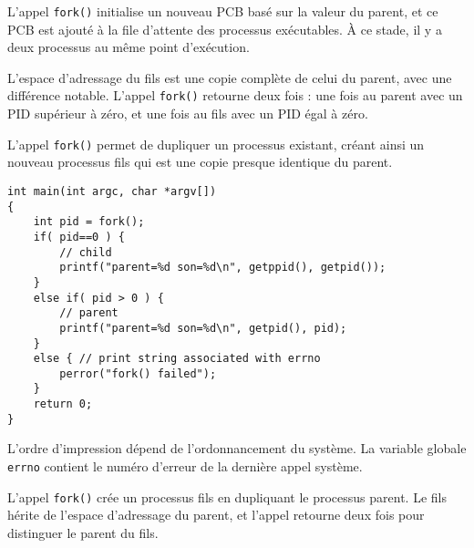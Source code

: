 \documentclass[12pt]{article}
\begin{document}
L'appel \texttt{fork()} initialise un nouveau PCB basé sur la valeur du parent, et ce PCB est ajouté à la file d'attente des processus exécutables. À ce stade, il y a deux processus au même point d'exécution.

L'espace d'adressage du fils est une copie complète de celui du parent, avec une différence notable. L'appel \texttt{fork()} retourne deux fois : une fois au parent avec un PID supérieur à zéro, et une fois au fils avec un PID égal à zéro.

\begin{tcolorbox}[title={Intuition}]
L'appel \texttt{fork()} permet de dupliquer un processus existant, créant ainsi un nouveau processus fils qui est une copie presque identique du parent.
\end{tcolorbox}

\begin{lstlisting}
int main(int argc, char *argv[])
{
    int pid = fork();
    if( pid==0 ) {
        // child
        printf("parent=%d son=%d\n", getppid(), getpid());
    }
    else if( pid > 0 ) {
        // parent
        printf("parent=%d son=%d\n", getpid(), pid);
    }
    else { // print string associated with errno
        perror("fork() failed");
    }
    return 0;
}
\end{lstlisting}

L'ordre d'impression dépend de l'ordonnancement du système. La variable globale \texttt{errno} contient le numéro d'erreur de la dernière appel système.

\begin{tcolorbox}[title={Fiche Récapitulative}]
L'appel \texttt{fork()} crée un processus fils en dupliquant le processus parent. Le fils hérite de l'espace d'adressage du parent, et l'appel retourne deux fois pour distinguer le parent du fils.
\end{tcolorbox}
\end{document}
